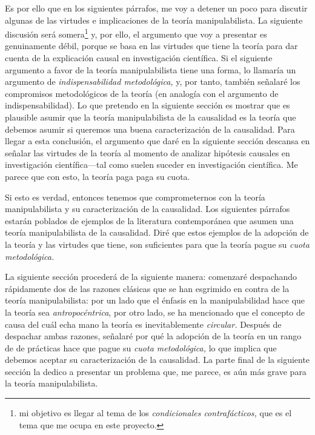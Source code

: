 Es por ello que en los siguientes párrafos, me voy a detener
un poco para discutir algunas de las virtudes e
implicaciones de la teoría manipulabilista. La siguiente
discusión será somera\footnote{
  mi objetivo es llegar al tema de los \emph{condicionales
  contrafácticos,} que es el tema que me ocupa en este
  proyecto.  
}
y, por ello, el argumento que voy a presentar es genuinamente
débil, porque se basa en las virtudes que tiene la teoría
para dar cuenta de la explicación causal en investigación
científica. Si el siguiente argumento a favor de la teoría
manipulabilista tiene una forma, lo llamaría un argumento de
\emph{indispensabilidad metodológica,} y, por tanto, también
señalaré los compromisos metodológicos de la teoría
\parencite{Quine1961} (en analogía con el
argumento de indispensabilidad). Lo que
pretendo en la siguiente sección es mostrar que es plausible asumir que la teoría
manipulabilista de la causalidad es la teoría que debemos
asumir si queremos una buena caracterización de la
causalidad. Para llegar a esta conclusión, el argumento que
daré en la siguiente sección descansa en
señalar las virtudes de la teoría al momento de analizar
hipótesis causales en investigación científica---tal como
suelen suceder en investigación científica. Me parece que
con esto, la teoría paga paga su cuota. 

Si esto es verdad, entonces
tenemos que comprometernos con la teoría manipulabilista y
su caracterización de la causalidad. Los siguientes párrafos
estarán poblados de ejemplos de la literatura
contemporánea que asumen una teoría manipulabilista de la
causalidad. Diré que estos ejemplos de la adopción de la
teoría y las virtudes que tiene, son suficientes para que la
teoría pague su \emph{cuota metodológica.} 

La siguiente sección procederá de la siguiente manera:
comenzaré despachando rápidamente dos de las razones
clásicas que se han esgrimido en contra de la teoría
manipulabilista: por un lado que el énfasis en la
manipulabilidad hace que la teoría sea
\emph{antropocéntrica}, por otro lado, se ha mencionado
que el concepto de causa del cuál echa mano la teoría es
inevitablemente \emph{circular.} Después de despachar ambas
razones, señalaré por qué la adopción de la teoría en un
rango de de prácticas hace que pague su \emph{cuota
metodológica,} lo que implica que debemos aceptar su
caracterización de la causalidad. La parte final de la
siguiente sección la dedico a presentar un problema que, me
parece, es aún más grave para la teoría manipulabilista.


